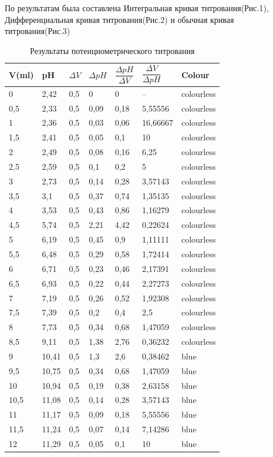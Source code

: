 \documentclass[a4paper,12pt]{article}
\begin{document}
По результатам была составлена Интегральная кривая титрования(Рис.1), Дифференциальная кривая титрования(Рис.2) и обычная кривая титрования(Рис.3)
\begin{table}
	\centering
    \begin{tabular}{|l|l|l|l|l|l|l|}
     \hline
    V(ml) & pH & $\Delta V$ & $\Delta pH$ & $\dfrac{\Delta pH}{\Delta V}$ & $\dfrac{\Delta V}{\Delta pH}$ & Colour\\ \hline
        0 & 2,42 & 0,5 & 0 & 0 & -- & colourless \\ \hline
        0,5 & 2,33 & 0,5 & 0,09 & 0,18 & 5,55556 & colourless \\ \hline
        1 & 2,36 & 0,5 & 0,03 & 0,06 & 16,66667 & colourless \\ \hline
        1,5 & 2,41 & 0,5 & 0,05 & 0,1 & 10 & colourless \\ \hline
        2 & 2,49 & 0,5 & 0,08 & 0,16 & 6,25 & colourless \\ \hline
        2,5 & 2,59 & 0,5 & 0,1 & 0,2 & 5 & colourless \\ \hline
        3 & 2,73 & 0,5 & 0,14 & 0,28 & 3,57143 & colourless \\ \hline
        3,5 & 3,1 & 0,5 & 0,37 & 0,74 & 1,35135 & colourless \\ \hline
        4 & 3,53 & 0,5 & 0,43 & 0,86 & 1,16279 & colourless \\ \hline
        4,5 & 5,74 & 0,5 & 2,21 & 4,42 & 0,22624 & colourless \\ \hline
        5 & 6,19 & 0,5 & 0,45 & 0,9 & 1,11111 & colourless \\ \hline
        5,5 & 6,48 & 0,5 & 0,29 & 0,58 & 1,72414 & colourless \\ \hline
        6 & 6,71 & 0,5 & 0,23 & 0,46 & 2,17391 & colourless \\ \hline
        6,5 & 6,93 & 0,5 & 0,22 & 0,44 & 2,27273 & colourless \\ \hline
        7 & 7,19 & 0,5 & 0,26 & 0,52 & 1,92308 & colourless \\ \hline
        7,5 & 7,39 & 0,5 & 0,2 & 0,4 & 2,5 & colourless \\ \hline
        8 & 7,73 & 0,5 & 0,34 & 0,68 & 1,47059 & colourless \\ \hline
        8,5 & 9,11 & 0,5 & 1,38 & 2,76 & 0,36232 & colourless \\ \hline
        9 & 10,41 & 0,5 & 1,3 & 2,6 & 0,38462 & blue \\ \hline
        9,5 & 10,75 & 0,5 & 0,34 & 0,68 & 1,47059 & blue \\ \hline
        10 & 10,94 & 0,5 & 0,19 & 0,38 & 2,63158 & blue \\ \hline
        10,5 & 11,08 & 0,5 & 0,14 & 0,28 & 3,57143 & blue \\ \hline
        11 & 11,17 & 0,5 & 0,09 & 0,18 & 5,55556 & blue \\ \hline
        11,5 & 11,24 & 0,5 & 0,07 & 0,14 & 7,14286 & blue \\ \hline
        12 & 11,29 & 0,5 & 0,05 & 0,1 & 10 & blue \\ \hline
    \end{tabular}
    \caption{Результаты потенциометрического титрования}
\end{table}
\end{document}
